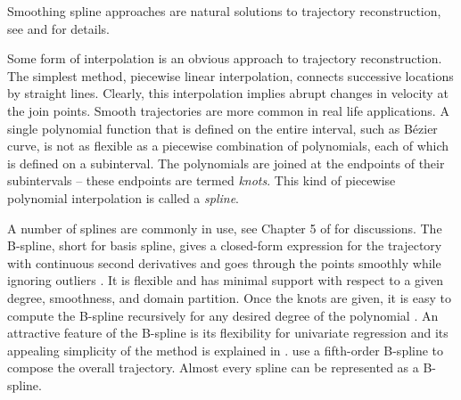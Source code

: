 Smoothing spline approaches are natural solutions to trajectory reconstruction, see 
\eg \cite{eubank2004simple} and \cite{durbin2012time} for details. 

Some form of interpolation is an obvious approach to trajectory reconstruction. The simplest method, piecewise linear interpolation, connects successive locations by straight lines. Clearly, this interpolation implies abrupt changes in velocity at the join points. Smooth trajectories are more common in real life applications. A single polynomial function that is defined on the entire interval, such as B\'ezier curve, is not as flexible as a piecewise combination of polynomials, each of which is defined on a subinterval. The polynomials are joined at the endpoints of their subintervals -- these endpoints are termed \textit{knots}. This kind of piecewise polynomial interpolation is called a \textit{spline}. 


A number of splines are commonly in use, see Chapter 5 of \cite{esl2009} for discussions. The B-spline, short for basis spline, gives a closed-form expression for the trajectory with continuous second derivatives and goes through the points smoothly while ignoring outliers \citep{komoriya1989trajectory, ben2004geometric}. It is flexible and has minimal support with respect to a given degree, smoothness, and domain partition. Once the knots are given, it is easy to compute the B-spline recursively for any desired degree of the polynomial \citep{de1978practical, cox1982practical}. An attractive feature of the B-spline is its flexibility for univariate regression and its appealing simplicity of the method is explained in \citep{dierckx1995curve, eilers1996flexible}. \cite{gasparetto2007new} use a fifth-order B-spline to compose the overall trajectory. Almost every spline can be represented as a B-spline. 

